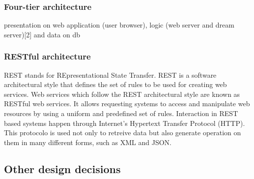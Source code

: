 \subsubsection{Four-tier architecture}
presentation on web application (user browser), logic (web server and dream server)[2] and data on db 

\subsubsection{RESTful architecture}
REST stands for REpresentational State Transfer. REST is a software architectural style that defines the set of rules to be used for creating web services. Web services which follow the REST architectural style are known as RESTful web services. It allows requesting systems to access and manipulate web resources by using a uniform and predefined set of rules. Interaction in REST based systems happen through Internet’s Hypertext Transfer Protocol (HTTP). This protocolo is used not only to retreive data but also generate operation on them in many different forms, such as XML and JSON.

\subsection{Other design decisions}

